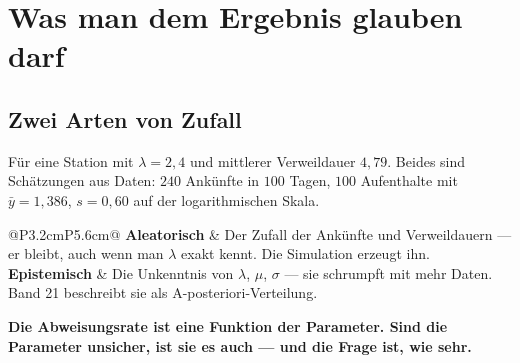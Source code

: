 \chapter{Was man dem Ergebnis glauben darf}

\section{Zwei Arten von Zufall}

\begin{merksatz}
Für eine Station mit $\lambda = 2{,}4$ und mittlerer Verweildauer $4{,}79$. Beides sind Schätzungen aus Daten: $240$ Ankünfte in $100$ Tagen, $100$ Aufenthalte mit $\bar y = 1{,}386$, $s = 0{,}60$ auf der logarithmischen Skala.

\begin{center}
{\small
\renewcommand{\arraystretch}{1.5}
\begin{tabular}{@{}P{3.2cm}P{5.6cm}@{}}
\toprule
\textbf{Aleatorisch} & Der Zufall der Ankünfte und Verweildauern --- er bleibt, auch wenn man $\lambda$ exakt kennt. Die Simulation erzeugt ihn.\\
\textbf{Epistemisch} & Die Unkenntnis von $\lambda$, $\mu$, $\sigma$ --- sie schrumpft mit mehr Daten. Band 21 beschreibt sie als A-posteriori-Verteilung.\\
\bottomrule
\end{tabular}}
\end{center}

\begin{center}
\begin{minipage}{0.9\textwidth}
\textbf{Die Abweisungsrate ist eine Funktion der Parameter. Sind die Parameter unsicher, ist sie es auch --- und die Frage ist, wie sehr.}
\end{minipage}
\end{center}

\begin{center}
\begin{minipage}{0.88\textwidth}
\end{minipage}
\end{center}
\end{merksatz}

